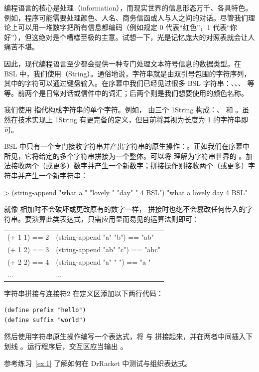 编程语言的核心是处理（information），而现实世界的信息形态万千、各具特色。例如，程序可能需要处理颜色、人名、商务信函或人与人之间的对话。尽管我们理论上可以用一堆数字把所有信息都编码（例如规定 0 代表“红色”，1 代表“你好”），但这绝对是个糟糕至极的主意。试想一下，光是记忆庞大的对照表就会让人痛苦不堪。

因此，现代编程语言至少都会提供一种专门处理文本符号信息的数据类型。在 BSL 中，我们使用（String）。通俗地说，字符串就是由双引号包围的字符序列，其中的字符可以通过键盘输入。在序幕中我们已经见过很多 BSL 字符串：、、、 等等。前两个是日常对话或信件中的词汇；后两个则是我们想要使用的颜色名称。

\begin{notebox}
我们使用  指代构成字符串的单个字符。例如， 由三个 1String 构成：、 和 。虽然在技术实现上 1String 有更完备的定义，但目前将其视为长度为 1 的字符串即可。
\end{notebox}

BSL 中只有一个专门接收字符串并产出字符串的原生操作：。正如我们在序幕中所见，它将给定的多个字符串拼接为一个整体。可以将  理解为字符串世界的 \code{+}。加法接收两个（或更多）数字并产生一个新数字；拼接操作则接收两个（或更多）字符串并产生一个新字符串：
\begin{replbox}
> (string-append "what a " "lovely " "day" " 4 BSL")
"what a lovely day 4 BSL"
\end{replbox}

就像 \code{+} 相加时不会破坏或更改原有的数字一样， 拼接时也绝不会篡改任何传入的字符串。要演算此类表达式，只需应用显而易见的运算法则即可：
\begin{stepperbox}[unbreakable]
\centering
\scriptsize\ttfamily
\begin{tabular}{@{}ll@{}}
\toprule
(+ 1 1) == 2 & (string-append "a" "b") == "ab" \\
(+ 1 2) == 3 & (string-append "ab" "c") == "abc" \\
(+ 2 2) == 4 & (string-append "a" " ") == "a " \\
...          & ... \\
\bottomrule
\end{tabular}
\end{stepperbox}

\begin{exercise}{字符串拼接与连接符}{2}
在定义区添加以下两行代码：
\begin{lstlisting}[language=BSL]
(define prefix "hello")
(define suffix "world")
\end{lstlisting}

然后使用字符串原生操作编写一个表达式，将  与  拼接起来，并在两者中间插入下划线 。运行程序后，交互区应当输出 。

参考练习~\ref{ex:1} 了解如何在 DrRacket 中测试与组织表达式。
\end{exercise}


